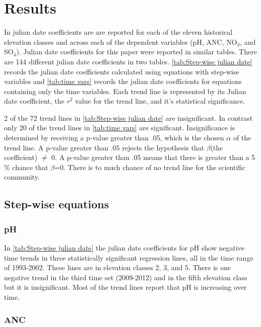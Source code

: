 \section{Results}

In \citet{robinson2008ph} julian date coefficients are are reported for each of the eleven historical elevation classes and across each of the dependent variables (pH, ANC, NO$_3$, and SO$_4$).  Julian date coefficients for this paper were reported in similar tables.  There are 144 different julian date coefficients in two tables.  \autoref{tab:Step-wise julian date} records the julian date coefficients calculated using equations with step-wise variables and \autoref{tab:time vars} records the julian date coefficients for  equations containing only the time variables.  Each trend line is represented by its Julian date coefficient, the $r^2$ value for the trend line, and it's statistical significance.

2 of the 72 trend lines in \autoref{tab:Step-wise julian date} are insignificant.  In contrast only 20 of the trend lines in \autoref{tab:time vars} are significant.   Insignificance is determined  by receiving a p-value greater than .05, which is the chosen $\alpha$ of the trend line.  A p-value greater than .05 rejects the hypothesis that $\beta$(the coefficient) $\neq$ 0.  A p-value greater than .05 means that there is greater than a 5$\%$ chance that $\beta$=0.  There is to much chance of no trend line for the scientific community.

\subsection{Step-wise equations}

\subsubsection{pH}%

In \autoref{tab:Step-wise julian date} the julian date coefficients for pH show negative time trends in three statistically significant regression lines, all in the time range of 1993-2002.  These lines are in elevation classes 2, 3, and 5.  There is one negative trend in the third time set (2009-2012) and in the fifth elevation class but it is insignificant.   Most of the trend lines report that pH is increasing over time.

\subsubsection{ANC}%

